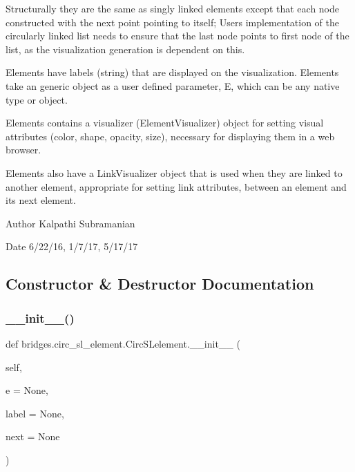 Structurally they are the same as singly linked elements except that each node constructed with the next point pointing to itself; User\textquotesingle{}s implementation of the circularly linked list needs to ensure that the last node points to first node of the list, as the visualization generation is dependent on this.

Elements have labels (string) that are displayed on the visualization. Elements take an generic object as a user defined parameter, E, which can be any native type or object.

Elements contains a visualizer (Element\+Visualizer) object for setting visual attributes (color, shape, opacity, size), necessary for displaying them in a web browser.

Elements also have a Link\+Visualizer object that is used when they are linked to another element, appropriate for setting link attributes, between an element and its next element.

\begin{DoxyAuthor}{Author}
Kalpathi Subramanian
\end{DoxyAuthor}
\begin{DoxyDate}{Date}
6/22/16, 1/7/17, 5/17/17 
\end{DoxyDate}


\subsection{Constructor \& Destructor Documentation}
\mbox{\label{classbridges_1_1circ__sl__element_1_1_circ_s_lelement_a691e2db0878e32d0298204685a120268}} 
\subsubsection{\texorpdfstring{\+\_\+\+\_\+init\+\_\+\+\_\+()}{\_\_init\_\_()}}
{\footnotesize\ttfamily def bridges.\+circ\+\_\+sl\+\_\+element.\+Circ\+S\+Lelement.\+\_\+\+\_\+init\+\_\+\+\_\+ (\begin{DoxyParamCaption}\item[{}]{self,  }\item[{}]{e = {\ttfamily None},  }\item[{}]{label = {\ttfamily None},  }\item[{}]{next = {\ttfamily None} }\end{DoxyParamCaption})}



